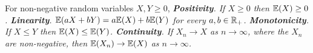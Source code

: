 \begin{theorem}\label{thm:prop_expe_non-neg}
For non-negative random variables $X,Y\geq 0$,
\ben
\it \textbf{Positivity}. If $X\geq 0$ then $\mathbb{E}(X)\geq 0$.
\it \textbf{Linearity}.  $\mathbb{E}(aX+bY) = a\mathbb{E}(X) + b\mathbb{E}(Y)$ for every $a,b\in\mathbb{R}_{+}$.
\it \textbf{Monotonicity}. If $X\leq Y$ then $\mathbb{E}(X)\leq\mathbb{E}(Y)$.
\it \textbf{Continuity}. If $X_n\to X$ as $n\to\infty$, where the $X_n$ are non-negative, then $\mathbb{E}(X_n)\to\mathbb{E}(X)$ as $n\to\infty$.
\een
\end{theorem}

\proofomitted

%


